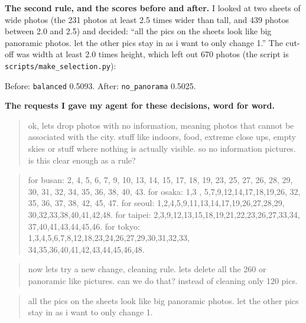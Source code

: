 \documentclass[11pt]{article}
\begin{document}
\textbf{The second rule, and the scores before and after.} I looked at two
sheets of wide photos (the 231 photos at least 2.5 times wider than tall, and
439 photos between 2.0 and 2.5) and decided: ``all the pics on the sheets look
like big panoramic photos. let the other pics stay in as i want to only change
1.'' The cut-off was width at least 2.0 times height, which left out 670
photos (the script is \texttt{scripts/make\_selection.py}):


Before: \texttt{balanced} 0.5093. After: \texttt{no\_panorama} 0.5025.



\textbf{The requests I gave my agent for these decisions, word for word.}

\begin{quote}\small
ok, lets drop photos with no information, meaning photos that cannot be
associated with the city. stuff like indoors, food, extreme close ups, empty
skies or stuff where nothing is actually visible. so no information pictures.
is this clear enough as a rule?
\end{quote}

\begin{quote}\small
for busan: 2, 4, 5, 6, 7, 9, 10, 13, 14, 15, 17, 18, 19, 23, 25, 27, 26, 28,
29, 30, 31, 32, 34, 35, 36, 38, 40, 43. for osaka: 1,3 , 5,7,9,12,14,17,18,19,26,
32, 35, 36, 37, 38, 42, 45, 47. for seoul: 1,2,4,5,9,11,13,14,17,19,26,27,28,29,
30,32,33,38,40,41,42,48. for taipei: 2,3,9,12,13,15,18,19,21,22,23,26,27,33,34,
37,40,41,43,44,45,46. for tokyo: 1,3,4,5,6,7,8,12,18,23,24,26,27,29,30,31,32,33,
34,35,36,40,41,42,43,44,45,46,48.
\end{quote}

\begin{quote}\small
now lets try a new change, cleaning rule. lets delete all the 260 or panoramic
like pictures. can we do that? instead of cleaning only 120 pics.
\end{quote}

\begin{quote}\small
all the pics on the sheets look like big panoramic photos. let the other pics
stay in as i want to only change 1.
\end{quote}

\end{document}
